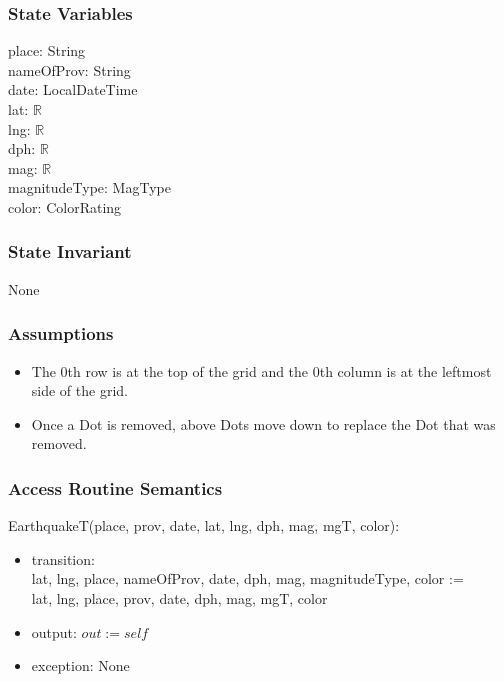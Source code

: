 \documentclass[12pt]{article}
\begin{document}
\subsubsection* {State Variables}

place: String\\ 
nameOfProv: String\\
date: LocalDateTime\\
lat: $\mathbb{R}$\\
lng: $\mathbb{R}$\\
dph: $\mathbb{R}$\\
mag: $\mathbb{R}$\\
magnitudeType: MagType\\
color: ColorRating

\subsubsection* {State Invariant}

None

\subsubsection* {Assumptions}

\begin{itemize}
\item The 0th row is at the top of the grid and the 0th column
  is at the leftmost side of the grid.
\item Once a Dot is removed, above Dots move down to replace the Dot that was removed.
\end{itemize}

\medskip

\subsubsection* {Access Routine Semantics}

EarthquakeT(place, prov, date, lat, lng, dph, mag, mgT, color):
\begin{itemize}
\item transition: \\ lat, lng, place, nameOfProv, date, dph, mag, magnitudeType, color :=\\
  lat, lng, place, prov, date, dph, mag, mgT, color
\item output: $\mathit{out} := \mathit{self}$
\item exception: None
\end{itemize}
\end{document}
